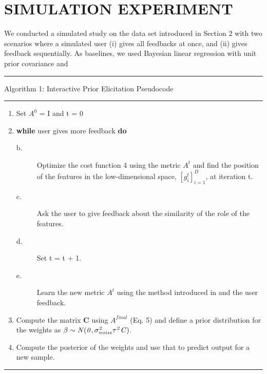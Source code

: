 \documentclass{sig-alternate}
\begin{document}
\section{SIMULATION EXPERIMENT}

We conducted a simulated study on the data set introduced in
Section 2 with two scenarios where a simulated user (i) gives all
feedbacks at once, and (ii) gives feedback sequentially. As baselines,
we used Bayesian linear regression with unit prior covariance and

\hrule{}
Algorithm 1: Interactive Prior Elicitation Pseudocode
\hrule{}

\begin{enumerate}
    \item Set $A^0$ = I and t = 0
    \item \textbf{while} user gives more feedback \textbf{do}
        \begin{description}
            \item [b.] Optimize the cost function 4 using the metric $A^t$ and find
the position of the features in the low-dimensional space, $[g^t_i]^D_{i=1}$, at iteration t.
            \item [c.] Ask the user to give feedback about the similarity of the
role of the features.
            \item [d.] Set t = t + 1.
            \item [e.] Learn the new metric $A^t$ using the method introduced in
\cite{Yang:2007:BAD:3020488.3020542} and the user feedback.
        \end{description}
        \item Compute the matrix \textbf{C} using $A^{final}$ (Eq. 5) and define a prior
distribution for the weights as $\beta\sim\it{N}(0,\sigma^2_{noise}\tau^2C)$.
        \item Compute the posterior of the weights and use that to predict
output for a new sample.
\end{enumerate}

\hrule{}
\end{document}
